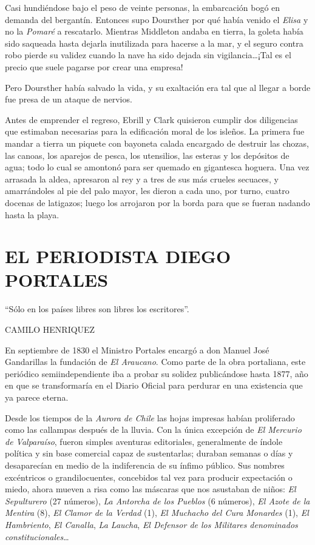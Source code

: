 \documentclass[10pt,twoside,openright]{memoir}
\begin{document}
Casi hundiéndose bajo el peso de
veinte personas, la embarcación bogó en demanda del bergantín. Entonces
supo Doursther por qué había venido el \emph{Elisa} y no la \emph{Pomaré} a
rescatarlo. Mientras Middleton andaba en tierra, la goleta había sido
saqueada hasta dejarla inutilizada para hacerse a la mar, y el seguro
contra robo pierde su validez cuando la nave ha sido dejada sin
vigilancia\ldots ¡Tal es el precio que suele pagarse por crear una empresa!

Pero Doursther había salvado la vida, y su exaltación era tal que al
llegar a borde fue presa de un ataque de nervios.

Antes de emprender el regreso, Ebrill y Clark quisieron cumplir dos
diligencias que estimaban necesarias para la edificación moral de los
isleños. La primera fue mandar a
tierra un piquete con bayoneta calada encargado de destruir las chozas,
las canoas, los aparejos de pesca, los utensilios, las esteras y los
depósitos de agua; todo lo cual se amontonó para ser
quemado
en gigantesca hoguera. Una vez arrasada la aldea, apresaron al rey y a
tres de sus más crueles secuaces, y amarrándoles al pie del palo mayor,
les dieron a cada uno, por turno, cuatro docenas de latigazos; luego los
arrojaron por la borda para que se fueran nadando hasta la playa.

\chapter{EL PERIODISTA DIEGO PORTALES}

\epigraph{``Sólo en los países libres son libres los escritores''.}{CAMILO HENRIQUEZ}

En septiembre de 1830 el Ministro Portales encargó a don Manuel José
Gandarillas la fundación de \emph{El Araucano}. Como parte de la obra portaliana,
este periódico semiindependiente iba
a probar su solidez publicándose hasta 1877, año en que se transformaría
en el Diario Oficial para perdurar en una existencia que ya parece
eterna.

Desde los tiempos de la \emph{Aurora de Chile} las hojas impresas habían
proliferado como las callampas después de la lluvia. Con la única
excepción de \emph{El Mercurio de Valparaíso}, fueron simples aventuras
editoriales, generalmente de índole política y sin base comercial capaz
de sustentarlas; duraban semanas o días y desaparecían en medio de la
indiferencia de su ínfimo público. Sus nombres excéntricos o
grandilocuentes, concebidos tal vez para producir expectación o miedo,
ahora mueven a risa como las máscaras que nos asustaban de niños: \emph{El
Sepulturero} (27 números), \emph{La Antorcha de los Pueblos} (6 números), \emph{El
Azote de la Mentira} (8), \emph{El Clamor de la Verdad} (1), \emph{El Muchacho del
Cura Monardes} (1), \emph{El Hambriento}, \emph{El Canalla}, \emph{La Laucha}, 
\emph{El Defensor de los Militares denominados constitucionales}\ldots{}
\end{document}
